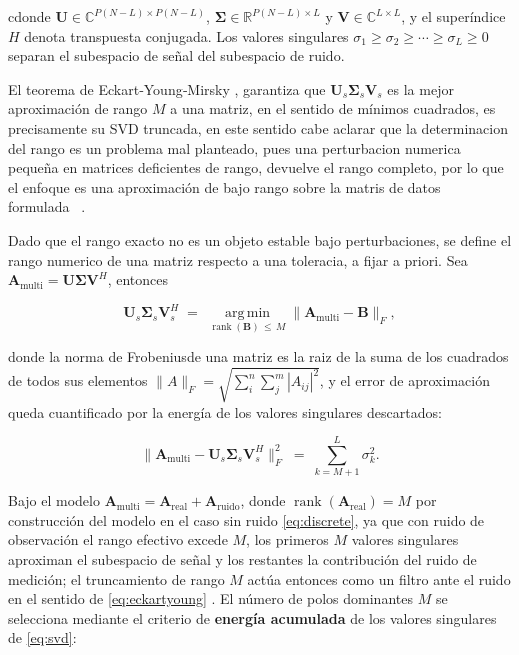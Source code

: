 cdonde $\mathbf{U} \in \mathbb{C}^{P(N-L) \times P(N-L)}$, $\mathbf{\Sigma} \in \mathbb{R}^{P(N-L) 
\times L}$ y $\mathbf{V} \in \mathbb{C}^{L \times L}$, y el superíndice $H$ denota transpuesta 
conjugada. Los valores singulares $\sigma_1 \geq \sigma_2 \geq \cdots \geq \sigma_L \geq 0$ 
separan el subespacio de señal del subespacio de ruido.

El teorema de Eckart‑Young‑Mirsky \cite{brunton2022}, garantiza que 
$ \mathbf{U}_s\boldsymbol{\Sigma}_s\mathbf{V}_s$ 
es la mejor aproximación de rango $M$ a una matriz, en el sentido de mínimos cuadrados, 
es precisamente su SVD truncada, en este sentido cabe aclarar que la determinacion del rango
es un problema mal planteado, pues una perturbacion numerica pequeña en matrices deficientes 
de rango, devuelve el rango completo, por lo que el enfoque es una aproximación de bajo
rango sobre la matris de datos formulada~\cite{Markovsky} \cite{Antoulas}. 

Dado que el rango exacto no es un objeto estable bajo perturbaciones, se define el rango 
numerico de una matriz respecto a una toleracia, a fijar a priori. Sea $\mathbf{A}_{\mathrm{multi}} 
= \mathbf{U}\boldsymbol{\Sigma}\mathbf{V}^H$, entonces

\begin{equation}
    \mathbf{U}_s\boldsymbol{\Sigma}_s\mathbf{V}_s^H
    \;=\;
    \operatorname*{arg\,min}_{\operatorname{rank}(\mathbf{B}) \,\le\, M}
    \bigl\lVert \mathbf{A}_{\mathrm{multi}} - \mathbf{B} \bigr\rVert_F,
    \label{eq:eckartyoung}
\end{equation}

donde la norma de Frobeniusde una matriz es la raiz de la suma de los cuadrados de todos
sus elementos $\| A \|_F = \sqrt{\sum_{i}^{n} \sum_{j}^{m} |A_{ij}|^2}$, y el error de 
aproximación queda cuantificado por la energía de los valores singulares descartados:

\begin{equation}
    \bigl\lVert \mathbf{A}_{\mathrm{multi}}
    - \mathbf{U}_s\boldsymbol{\Sigma}_s\mathbf{V}_s^H \bigr\rVert_F^2
    \;=\; \sum_{k=M+1}^{L} \sigma_k^2 .
    \label{eq:trunc_error}
\end{equation}

Bajo el modelo $\mathbf{A}_{\mathrm{multi}} = \mathbf{A}_{\mathrm{real}} + \mathbf{A}_{\mathrm{ruido}}$, 
donde $\operatorname{rank}(\mathbf{A}_{\mathrm{real}}) = M$ por construcción del
modelo en el caso sin ruido \eqref{eq:discrete}, ya que con ruido de observación 
el rango efectivo excede $M$, los primeros $M$ valores singulares aproximan el
subespacio de señal y los restantes la contribución del ruido de medición;
el truncamiento de rango $M$ actúa entonces como un filtro ante el ruido
en el sentido de \eqref{eq:eckartyoung} \cite{brunton2022,Tufts1982}. El número de polos 
dominantes $M$ se selecciona mediante el criterio de \textbf{energía acumulada}
de los valores singulares de \eqref{eq:svd}:

